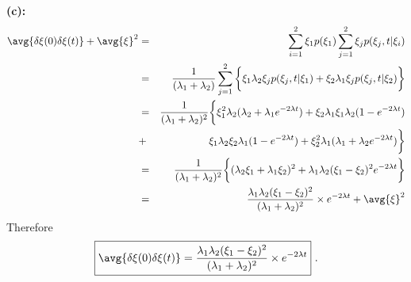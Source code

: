 \textbf{(c):}
\begin{eqnarray}
\avg{\delta \xi(0) \delta \xi(t)} + \avg{\xi}^2 &=& \sum_{i=1}^{2} \xi_1 p(\xi_1) \sum_{j=1}^{2}  \xi_j p(\xi_j, t| \xi_i) \nonumber \\
&=& \frac{1}{(\lambda_1 + \lambda_2)}\sum_{j=1}^{2} \bigg\{  \xi_1 \lambda_2 \xi_j p(\xi_j, t| \xi_1) + \xi_2 \lambda_1 \xi_j p(\xi_j, t| \xi_2) \bigg\} \nonumber \\
&=& \frac{1}{(\lambda_1 + \lambda_2)^2} \bigg\{  \xi_1^2 \lambda_2 (\lambda_2 + \lambda_1 e^{-2 \lambda t}) + \xi_2 \lambda_1 \xi_1 \lambda_2 (1-e^{-2 \lambda t}) \nonumber \\
&+& \xi_1 \lambda_2 \xi_2 \lambda_1 (1-e^{-2 \lambda t}) + \xi_2^2 \lambda_1 (\lambda_1 + \lambda_2 e^{-2 \lambda t}) \bigg\} \nonumber \\
&=& \frac{1}{(\lambda_1 + \lambda_2)^2} \bigg\{ (\lambda_2 \xi_1 + \lambda_1 \xi_2)^2  + \lambda_1 \lambda_2 (\xi_1-\xi_2)^2 e^{- 2 \lambda t} \bigg\} \nonumber  \\
&=& \frac{\lambda_1 \lambda_2 (\xi_1-\xi_2)^2}{(\lambda_1 + \lambda_2)^2} \times e^{- 2 \lambda t} + \avg{\xi}^2
\end{eqnarray}
Therefore
\begin{equation}
\boxed{\avg{\delta \xi(0) \delta \xi(t)} = \frac{\lambda_1 \lambda_2 (\xi_1-\xi_2)^2}{(\lambda_1 + \lambda_2)^2} \times e^{- 2 \lambda t}}~.
\end{equation}
